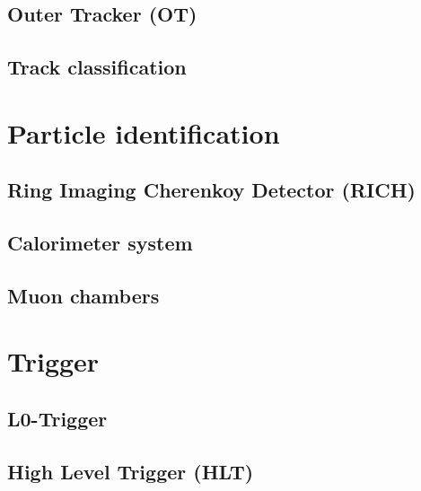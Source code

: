 \subsection{Outer Tracker (OT)}

\subsection{Track classification}


\section{Particle identification}

\subsection{Ring Imaging Cherenkoy Detector (RICH)}

\subsection{Calorimeter system}

\subsection{Muon chambers}

\section{Trigger}

\subsection{L0-Trigger}

\subsection{High Level Trigger (HLT)}
